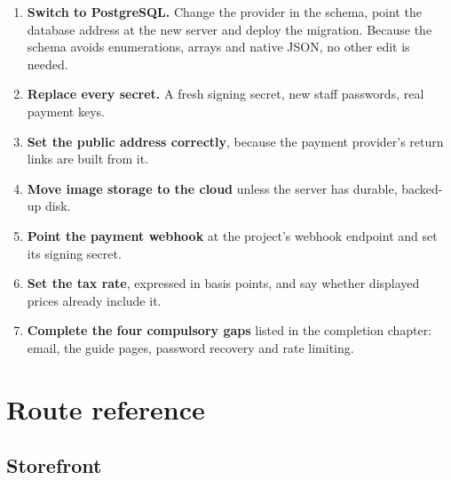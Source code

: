 \documentclass[11pt,a4paper]{report}
\begin{document}
\begin{enumerate}
  \item \textbf{Switch to PostgreSQL.} Change the provider in the schema,
        point the database address at the new server and deploy the migration.
        Because the schema avoids enumerations, arrays and native JSON, no
        other edit is needed.
  \item \textbf{Replace every secret.} A fresh signing secret, new staff
        passwords, real payment keys.
  \item \textbf{Set the public address correctly}, because the payment
        provider's return links are built from it.
  \item \textbf{Move image storage to the cloud} unless the server has
        durable, backed-up disk.
  \item \textbf{Point the payment webhook} at the project's webhook endpoint
        and set its signing secret.
  \item \textbf{Set the tax rate}, expressed in basis points, and say whether
        displayed prices already include it.
  \item \textbf{Complete the four compulsory gaps} listed in the completion
        chapter: email, the guide pages, password recovery and rate limiting.
\end{enumerate}

\appendix

\chapter{Route reference}

\section{Storefront}
\end{document}
